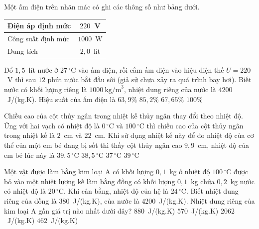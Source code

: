 	\begin{ex}%
		Một ấm điện trên nhãn mác có ghi các thông số như bảng dưới.
		\begin{center}
			\begin{tabular}{|l|c|}
				\hline
				\textbf{Điện áp định mức} & \textbf{$220$~V}\\
				\hline
				Công suất định mức & $1000$~W\\
				\hline
				Dung tích & $2{,}0$~lít\\
				\hline
			\end{tabular}
		\end{center}
		Đổ $1{,}5$~lít nước ở $27\,^\circ\text{C}$ vào ấm điện, rồi cắm ấm điện vào hiệu điện thế $U=220$~V thì sau $12$ phút nước bắt đầu sôi (giả sử chưa xảy ra quá trình bay hơi). Biết nước có khối lượng riêng là $1000~\text{kg/m}^3$, nhiệt dung riêng của nước là $4200$~J/(kg.K). Hiệu suất của ấm điện là
		\choice
		{\True $63{,}9\%$}
		{$85{,}2\%$}
		{$67{,}65\%$}
		{$100\%$}
	\end{ex}

	\begin{ex}%
		Chiều cao của cột thủy ngân trong nhiệt kế thủy ngân thay đổi theo nhiệt độ. Ứng với hai vạch có nhiệt độ là $0\,^\circ\text{C}$ và $100\,^\circ\text{C}$ thì chiều cao của cột thủy ngân trong nhiệt kế là $2$~cm và $22$~cm. Khi sử dụng nhiệt kế này để đo nhiệt độ của cơ thể của một em bé đang bị sốt thì thấy cột thủy ngân cao $9{,}9$~cm, nhiệt độ của em bé lúc này là
		\choice
		{\True $39{,}5\,^\circ\text{C}$}
		{$38{,}5\,^\circ\text{C}$}
		{$37\,^\circ\text{C}$}
		{$39\,^\circ\text{C}$}
	\end{ex}

	\begin{ex}%
		Một vật được làm bằng kim loại A có khối lượng $0{,}1$~kg ở nhiệt độ $100\,^\circ\text{C}$ được bỏ vào một nhiệt lượng kế làm bằng đồng có khối lượng $0{,}1$~kg chứa $0{,}2$~kg nước có nhiệt độ là $20\,^\circ\text{C}$. Khi cân bằng, nhiệt độ của hệ là $24\,^\circ\text{C}$. Biết nhiệt dung riêng của đồng là $380$~J/(kg.K), của nước là $4200$~J/(kg.K). Nhiệt dung riêng của kim loại A gần giá trị nào nhất dưới đây?
		\choice
		{$880$~J/(kg.K)}
		{$570$~J/(kg.K)}
		{$2062$~J/(kg.K)}
		{\True $462$~J/(kg.K)}
	\end{ex}

